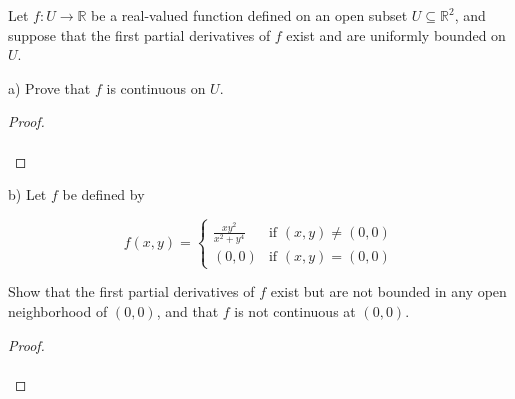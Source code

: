 Let $f:U \to \mathbb{R}$ be a real-valued function defined on an open subset $U \subseteq \mathbb{R}^2$, and suppose
that the first partial derivatives of $f$ exist and are uniformly bounded on $U$.

a) Prove that $f$ is continuous on $U$.

\begin{proof}\renewcommand{\qedsymbol}{}\ \\\\
\end{proof}

\pagebreak

b) Let $f$ be defined by 

   $$
   f(x, y) = \begin{cases}
     \frac{xy^2}{x^2 + y^4} &\text{if } (x, y) \neq (0, 0) \\
     (0, 0)    &\text{if } (x, y) = (0, 0)
   \end{cases} 
   $$

   Show that the first partial derivatives of $f$ exist but are not bounded in any open neighborhood of $(0, 0)$, and
   that $f$ is not continuous at $(0, 0)$.

\begin{proof}\renewcommand{\qedsymbol}{}\ \\\\
\end{proof}

